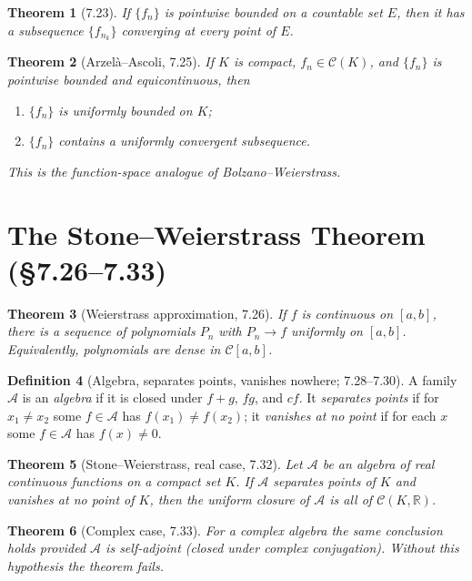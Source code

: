 \documentclass[11pt]{article}
\theoremstyle{definition}
\newtheorem{definition}{Definition}[section]
\theoremstyle{plain}
\newtheorem{theorem}[definition]{Theorem}
\newcommand{\R}{\mathbb{R}}
\newcommand{\CX}{\mathscr{C}}      %
\renewcommand{\to}{\longrightarrow}
\begin{document}
\begin{theorem}[7.23]
If $\{f_n\}$ is pointwise bounded on a countable set $E$, then it has a subsequence
$\{f_{n_k}\}$ converging at every point of $E$.
\end{theorem}

\begin{theorem}[Arzel\`a--Ascoli, 7.25]
If $K$ is compact, $f_n\in\CX(K)$, and $\{f_n\}$ is pointwise bounded and
equicontinuous, then
\begin{enumerate}[label=(\alph*), leftmargin=2em]
  \item $\{f_n\}$ is uniformly bounded on $K$;
  \item $\{f_n\}$ contains a \emph{uniformly} convergent subsequence.
\end{enumerate}
This is the function-space analogue of Bolzano--Weierstrass.
\end{theorem}

\section{The Stone--Weierstrass Theorem (\S7.26--7.33)}

\begin{theorem}[Weierstrass approximation, 7.26]
If $f$ is continuous on $[a,b]$, there is a sequence of polynomials $P_n$ with
$P_n\to f$ uniformly on $[a,b]$. Equivalently, polynomials are \emph{dense} in
$\CX[a,b]$.
\end{theorem}

\begin{definition}[Algebra, separates points, vanishes nowhere; 7.28--7.30]
A family $\mathscr{A}$ is an \emph{algebra} if it is closed under $f+g$, $fg$, and
$cf$. It \emph{separates points} if for $x_1\neq x_2$ some $f\in\mathscr{A}$ has
$f(x_1)\neq f(x_2)$; it \emph{vanishes at no point} if for each $x$ some
$f\in\mathscr{A}$ has $f(x)\neq 0$.
\end{definition}

\begin{theorem}[Stone--Weierstrass, real case, 7.32]
Let $\mathscr{A}$ be an algebra of real continuous functions on a compact set $K$.
If $\mathscr{A}$ separates points of $K$ and vanishes at no point of $K$, then the
uniform closure of $\mathscr{A}$ is \emph{all} of $\CX(K,\R)$.
\end{theorem}

\begin{theorem}[Complex case, 7.33]
For a complex algebra the same conclusion holds provided $\mathscr{A}$ is
\emph{self-adjoint} (closed under complex conjugation). Without this hypothesis
the theorem fails.
\end{theorem}
\end{document}
